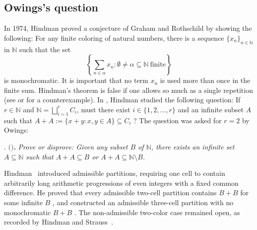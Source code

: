 \documentclass[reqno,12pt]{amsart}
\newtheorem{ques}[thm]{Question}
\def \N {\mathbb N}
\numberwithin{equation}{section}
\begin{document}
\subsection{Owings's question}

In 1974, Hindman \cite[p.~1]{Hindman74} proved a conjecture of Graham and Rothschild by showing the following: For any finite coloring of natural numbers, there is a sequence $\{x_n\}_{n\in \N}$ in $\N$ such that the set
$$\left\{\sum_{n\in \alpha}x_n:\emptyset \neq \alpha\subseteq \N\ \text{finite}\right\}$$ is monochromatic.
It is important that no term $x_n$ is used more than once in the finite sum. Hindman's theorem is false if one allows so much as a single repetition (see \cite[p.~138]{Hindman79} or \cite[p.~19]{Neil79} for a counterexample). In \cite[pp.~19--20]{Neil79}, Hindman studied the following question: If $r\in \N$ and $\N=\bigsqcup_{i=1}^rC_i$, must there exist $i\in \{1,2,\ldots, r\}$ and an infinite subset $A$ such that $A+A:=\{x+y: x,y\in A\}\subseteq C_i$ ? The question was asked for $r=2$ by Owings:

\medskip
{}. $($\cite[Problem E2494]{Owings74}$)${\bf .} {\em Prove or disprove: Given any subset $B$ of $\N$, there exists an infinite set $A\subseteq \N$ such that $A+A\subseteq B$ or $A+A\subseteq \N\setminus B$.}

Hindman~\cite[Definition~2.2]{Neil79}
introduced admissible partitions, requiring one cell to contain arbitrarily
long arithmetic progressions of even integers with a fixed common
difference.  He proved that every admissible two-cell partition contains
$B+B$ for some infinite $B$
\cite[Corollary~2.10]{Neil79}, and constructed an admissible
three-cell partition with no monochromatic $B+B$
\cite[Theorem~2.4]{Neil79}.
The non-admissible two-color case
remained open, as recorded by Hindman and
Strauss~\cite[p.~458]{HS}.





\end{document}
